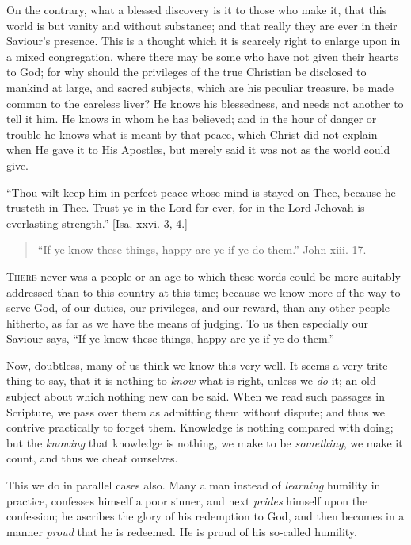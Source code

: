 On the contrary, what a blessed discovery is it to
those who make it, that this world is but vanity and
without substance; and that really they are ever in their
Saviour's presence. This is a thought which it is
scarcely right to enlarge upon in a mixed congregation,
where there may be some who have not given their hearts
to God; for why should the privileges of the true
Christian be disclosed to mankind at large, and sacred
subjects, which are his peculiar treasure, be made common
to the careless liver? He knows his blessedness, and
needs not another to tell it him. He knows in whom he has
believed; and in the hour of danger or trouble he knows
what is meant by that peace, which Christ did not explain
when He gave it to His Apostles, but merely said it was
not as the world could give.

``Thou wilt keep him in perfect peace whose mind
is stayed on Thee, because he trusteth in Thee. Trust ye
in the Lord for ever, for in the Lord Jehovah is
everlasting strength.'' [Isa. xxvi. 3, 4.]


\begin{quote}

``If ye know these things, happy are ye if ye
do them.'' John xiii. 17.

\end{quote}

T\textsc{here} never was a people or an age to which these
words could be more suitably addressed than to this
country at this time; because we know more of the way to
serve God, of our duties, our privileges, and our reward,
than any other people hitherto, as far as we have the
means of judging. To us then especially our Saviour says,
``If ye know these things, happy are ye if ye do
them.''

Now, doubtless, many of us think we know this very
well. It seems a very trite thing to say, that it is
nothing to \emph{know} what is right, unless we \emph{do}
it; an old subject about which nothing new can be said.
When we read such passages in Scripture, we pass over
them as admitting them without dispute; and thus we
contrive practically to forget them. Knowledge is nothing
compared with doing; but the \emph{knowing} that
knowledge is nothing, we make to be \emph{something},
we make it count, and thus we cheat ourselves.

This we do in parallel cases also. Many a man instead of \emph{learning} humility in practice, confesses
himself a poor sinner, and next \emph{prides} himself
upon the confession; he ascribes the glory of his
redemption to God, and then becomes in a manner \emph{proud}
that he is redeemed. He is proud of his so-called
humility.

